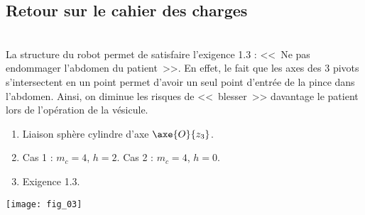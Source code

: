\subsection*{Retour sur le cahier des charges}



\ifprof
\begin{corrige}~\\
La structure du robot permet de satisfaire l'exigence 1.3 : <<~Ne pas endommager l'abdomen du patient~>>. En effet, le fait que les axes des 3 pivots s'intersectent en un point permet d'avoir un seul point d'entrée de la pince dans l'abdomen. Ainsi, on diminue les risques de <<~blesser~>> davantage le patient lors de l'opération de la vésicule. 
\end{corrige}
\else
\fi


\ifprof
\else
\ifcolle
\else
\begin{marginfigure}[-4cm]
\begin{solution}
\begin{enumerate}
\item Liaison sphère cylindre d'axe $\axe{O}{z_3}$.
\item Cas 1 : $m_c=4$, $h=2$. Cas 2 : $m_c=4$, $h=0$.
\item Exigence 1.3.
\end{enumerate} 
\end{solution}
\end{marginfigure}
\fi
\fi
\normalsize


\ifprof
\else


\begin{center}
\texttt{[image: fig\_03]}
\end{center}
\fi

